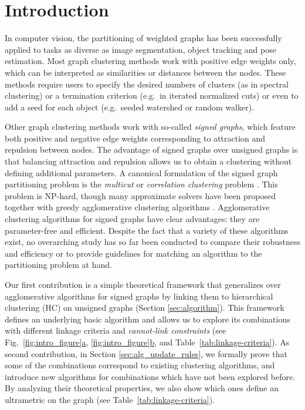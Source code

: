 \section{Introduction}
In computer vision, the partitioning of weighted graphs has been successfully applied to tasks as diverse as image segmentation, object tracking and pose estimation. 
Most graph clustering methods work with positive edge weights only, which can be interpreted as similarities or distances between the nodes. These methods require users to specify the desired numbers of clusters (as in spectral clustering) or a termination criterion (e.g.\ in iterated normalized cuts) or even to add a seed for each object  (e.g.\ seeded watershed or random walker).  

Other graph clustering methods work with so-called \emph{signed graphs}, which feature both positive and negative edge weights corresponding to attraction and repulsion between nodes. The advantage of signed graphs over unsigned graphs is that balancing attraction and repulsion allows us to obtain a clustering without defining additional parameters. A canonical formulation of the signed graph partitioning problem is the \emph{multicut} or \emph{correlation clustering} problem \cite{kappes2011globally,chopra1991multiway}. This problem is NP-hard, though many approximate solvers have been proposed \cite{lange2018combinatorial,pape2017solving,beier2016efficient,yarkony2012fast} together with greedy agglomerative clustering algorithms \cite{keuper2015efficient,levinkov2017comparative,wolf2018mutex,kardoostsolving}. 
Agglomerative clustering algorithms for signed graphs have clear advantages: they are parameter-free and efficient. Despite the fact that a variety of these algorithms exist, no overarching study has so far been conducted to compare their robustness and efficiency or to provide guidelines for matching an algorithm to the partitioning problem at hand. 


Our first contribution is a simple theoretical framework that generalizes over agglomerative algorithms for signed graphs by linking them to hierarchical clustering (HC) on unsigned graphs (Section \ref{sec:algorithm}). This framework defines an underlying basic algorithm and allows us to explore its combinations with different linkage criteria and \emph{cannot-link constraints} (see Fig.~\hyperref[fig:intro_figure]{\ref*{fig:intro_figure}a}, \hyperref[fig:intro_figure]{\ref*{fig:intro_figure}b}, and Table~\ref{tab:linkage-criteria}). 
As second contribution, in Section \ref{sec:alg_update_rules}, we formally prove that some of the combinations correspond to existing clustering algorithms, and introduce new algorithms for combinations which have not been explored before. By analyzing their theoretical properties, we also show which ones define an ultrametric on the graph (see Table~\ref{tab:linkage-criteria}).

